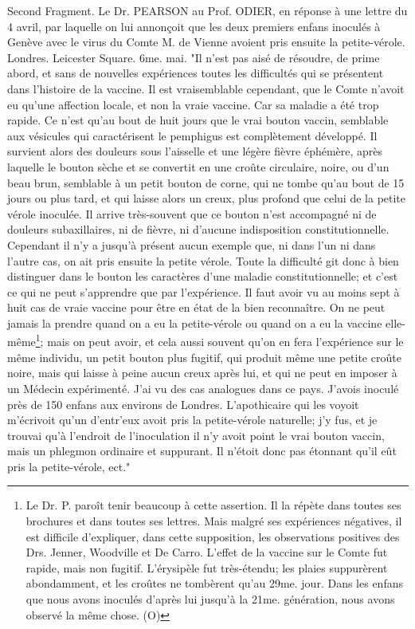 Second Fragment. Le Dr. PEARSON au Prof. ODIER, en réponse à une lettre du 4 avril, par laquelle on lui annonçoit que les deux premiers enfans inoculés à Genève avec le virus du Comte M. de Vienne avoient pris ensuite la petite-vérole. Londres. Leicester Square. 6me. mai.
"Il n'est pas aisé de résoudre, de prime abord, et sans de nouvelles expériences toutes\setcounter{page}{280} les difficultés qui se présentent dans l'histoire de la vaccine. Il est vraisemblable cependant, que le Comte n'avoit eu qu'une affection locale, et non la vraie vaccine. Car sa maladie a été trop rapide. Ce n'est qu'au bout de huit jours que le vrai bouton vaccin, semblable aux vésicules qui caractérisent le pemphigus est complètement développé. Il survient alors des douleurs sous l'aisselle et une légère fièvre éphémère, après laquelle le bouton sèche et se convertit en une croûte circulaire, noire, ou d'un beau brun, semblable à un petit bouton de corne, qui ne tombe qu'au bout de 15 jours ou plus tard, et qui laisse alors un creux, plus profond que celui de la petite vérole inoculée. Il arrive très-souvent que ce bouton n'est accompagné ni de douleurs subaxillaires, ni de fièvre, ni d'aucune indisposition constitutionnelle. Cependant il n'y a jusqu'à présent aucun exemple que, ni dans l'un ni dans l'autre cas, on ait pris ensuite la petite vérole. Toute la difficulté git donc à bien distinguer dans le bouton les caractères d'une maladie constitutionnelle; et c'est ce qui ne peut s'apprendre que par l'expérience. Il faut avoir vu au moins sept à huit cas de vraie vaccine pour être en état de la bien reconnaître. On ne peut jamais la prendre quand on a eu\setcounter{page}{281} la petite-vérole ou quand on a eu la vaccine elle-même\footnote{Le Dr. P. paroît tenir beaucoup à cette assertion. Il la répète dans toutes ses brochures et dans toutes ses lettres. Mais malgré ses expériences négatives, il est difficile d'expliquer, dans cette supposition, les observations positives des Drs. Jenner, Woodville et De Carro. L'effet de la vaccine sur le Comte fut rapide, mais non fugitif. L'érysipèle fut très-étendu; les plaies suppurèrent abondamment, et les croûtes ne tombèrent qu'au 29me. jour. Dans les enfans que nous avons inoculés d'après lui jusqu'à la 21me. génération, nous avons observé la même chose. (O)}; mais on peut avoir, et cela aussi souvent qu'on en fera l'expérience sur le même individu, un petit bouton plus fugitif, qui produit même une petite croûte noire, mais qui laisse à peine aucun creux après lui, et qui ne peut en imposer à un Médecin expérimenté. J'ai vu des cas analogues dans ce pays. J'avois inoculé près de 150 enfans aux environs de Londres. L'apothicaire qui les voyoit m'écrivoit qu'un d'entr'eux avoit pris la petite-vérole naturelle; j'y fus, et je trouvai qu'à l'endroit de l'inoculation il n'y avoit point le vrai bouton vaccin, mais un phlegmon ordinaire et suppurant. Il n'étoit donc pas étonnant qu'il eût pris la petite-vérole, ect."
\setcounter{page}{282}

